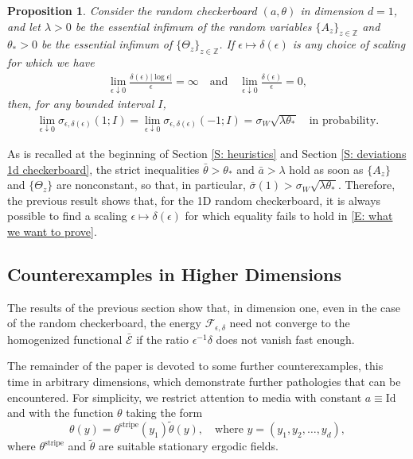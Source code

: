\documentclass[10pt,a4paper]{amsart}
\newtheorem{prop}{Proposition}
\begin{document}
	\begin{prop}\label{P: deviations 1d checkerboard}
	Consider the random checkerboard $(a,\theta)$ in dimension $d = 1$, and let $\lambda > 0$ be the essential infimum of the random variables $\{A_{z}\}_{z \in \mathbb{Z}}$ and $\theta_{*} > 0$ be the essential infimum of $\{ \Theta_{z} \}_{z \in \mathbb{Z}}$.  If $\epsilon \mapsto \delta(\epsilon)$ is any choice of scaling for which we have
		\begin{align*}
			\lim_{\epsilon \downarrow 0} \frac{ \delta(\epsilon) | \log \epsilon | }{ \epsilon } = \infty \quad \text{and} \quad \lim_{\epsilon \downarrow 0} \frac{ \delta(\epsilon) }{ \epsilon } = 0,
		\end{align*}
	then, for any bounded interval $I$,
		\begin{align*}
			\lim_{ \epsilon \downarrow 0 } \sigma_{\epsilon,\delta(\epsilon)} ( 1 ; I ) = \lim_{ \epsilon \downarrow 0 }  \sigma_{\epsilon,\delta(\epsilon)} ( -1 ; I ) = \sigma_{W} \sqrt{ \lambda \theta_{*} } \quad \text{in probability.}
		\end{align*}
	\end{prop}
		
As is recalled at the beginning of Section \ref{S: heuristics} and Section \ref{S: deviations 1d checkerboard}, the strict inequalities $\bar{\theta} > \theta_{*}$ and $\bar{a} > \lambda$ hold as soon as $\{A_{z}\}$ and $\{\Theta_{z}\}$ are nonconstant, so that, in particular, $\bar{\sigma}(1) > \sigma_{W} \sqrt{ \lambda \theta_{*} }$.  Therefore, the previous result shows that, for the 1D random checkerboard, it is always possible to find a scaling $\epsilon \mapsto \delta(\epsilon)$ for which equality fails to hold in \eqref{E: what we want to prove}.
	
\subsection{Counterexamples in Higher Dimensions} The results of the previous section show that, in dimension one, even in the case of the random checkerboard, the energy $\mathscr{F}_{\epsilon,\delta}$ need not converge to the homogenized functional $\bar{\mathscr{E}}$ if the ratio $\epsilon^{-1} \delta$ does not vanish fast enough.  

The remainder of the paper is devoted to some further counterexamples, this time in arbitrary dimensions, which demonstrate further pathologies that can be encountered. For simplicity, we restrict attention to media with constant $a \equiv \text{Id}$ and with the function $\theta$ taking the form
	\begin{equation} \label{E: quasi one dimensional}
		\theta(y) = \theta^{\text{stripe}}(y_{1}) \tilde{\theta}(y), \quad \text{where} \, \, y = (y_{1},y_{2},\dots,y_{d}),
	\end{equation}
where $\theta^{\text{stripe}}$ and $\tilde{\theta}$ are suitable stationary ergodic fields.
\end{document}
